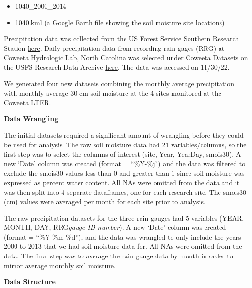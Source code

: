\documentclass[
  12pt,
]{article}
\providecommand{\tightlist}{%
  \setlength{\itemsep}{0pt}\setlength{\parskip}{0pt}}
\begin{document}
\begin{itemize}
\tightlist
\item
  1040\_2000\_2014
\item
  1040.kml (a Google Earth file showing the soil moisture site
  locations)
\end{itemize}

Precipitation data was collected from the US Forest Service Southern
Research Station
\href{https://www.srs.fs.usda.gov/coweeta/tools-and-data/}{here}. Daily
precipitation data from recording rain gages (RRG) at Coweeta Hydrologic
Lab, North Carolina was selected under Coweeta Datasets on the USFS
Research Data Archive
\href{https://www.fs.usda.gov/rds/archive/Catalog/RDS-2017-0031}{here}.
The data was accessed on 11/30/22.

We generated four new datasets combining the monthly average
precipitation with monthly average 30 cm soil moisture at the 4 sites
monitored at the Coweeta LTER.

\textbf{Data Wrangling}

The initial datasets required a significant amount of wrangling before
they could be used for analysis. The raw soil moisture data had 21
variables/columns, so the first step was to select the columns of
interest (site, Year, YearDay, smois30). A new `Date' column was created
(format = ``\%Y-\%j'') and the data was filtered to exclude the smois30
values less than 0 and greater than 1 since soil moisture was expressed
as percent water content. All NAs were omitted from the data and it was
then split into 4 separate dataframes, one for each research site. The
smois30 (cm) values were averaged per month for each site prior to
analysis.

The raw precipitation datasets for the three rain gauges had 5 variables
(YEAR, MONTH, DAY, RRG\emph{gauge ID number}). A new `Date' column was
created (format = ``\%Y-\%m-\%d''), and the data was wrangled to only
include the years 2000 to 2013 that we had soil moisture data for. All
NAs were omitted from the data. The final step was to average the rain
gauge data by month in order to mirror average monthly soil moisture.

\textbf{Data Structure}
\end{document}

